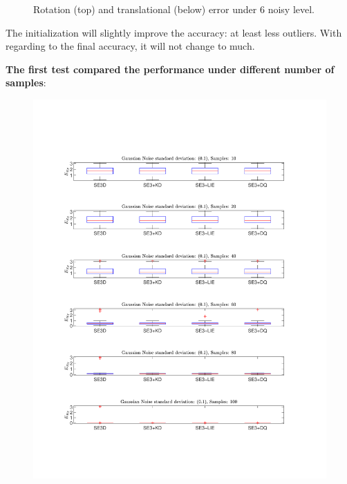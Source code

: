 \documentclass[a4paper]{report}
\begin{document}
\begin{figure}
\caption{Rotation (top) and translational (below) error under $6$ noisy level.}
\end{figure}
The initialization will slightly improve the accuracy: at least less outliers. With regarding to the final accuracy, it will not change to much.

\textbf{The first test compared the performance under different number of samples}:
\begin{figure}
\centering
\includegraphics[scale=0.4]{./hand_eye_figures/se3/r_vs_num}

\end{figure}
\end{document}
